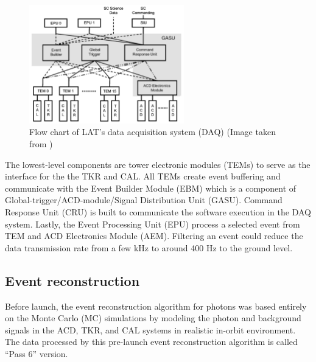 \begin{figure}[h!]
    \centering
    \includegraphics[width=0.6\textwidth]{content/background/figures/fermi_daq.png}
    \caption{Flow chart of LAT's data acquisition system (DAQ) (Image taken from \cite{FermiLAT})}
    \label{fig:fermi_daq}
\end{figure}

The lowest-level components are tower electronic modules
(TEMs) to serve as the interface for the the TKR and CAL.
All TEMs create event 
buffering and communicate with the Event Builder Module (EBM) which is a
component of Global-trigger/ACD-module/Signal Distribution Unit (GASU).
Command Response Unit (CRU) is built to communicate the
software execution in the DAQ system. Lastly, the Event Processing Unit (EPU)
process a selected event from TEM and ACD Electronics Module (AEM).
Filtering an event could reduce the data transmission rate from 
a few kHz to around 400 Hz to the ground level.


\subsection{Event reconstruction}

Before launch, the event reconstruction algorithm for photons
was based entirely on the Monte Carlo (MC) simulations by
modeling the photon and background signals in the ACD, TKR,
and CAL systems in realistic in-orbit environment.
The data processed by this pre-launch event reconstruction
algorithm is called ``Pass 6'' version.


